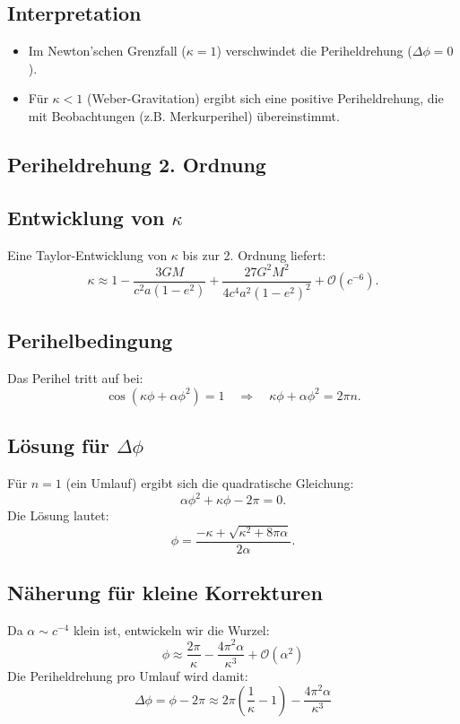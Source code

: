 \subsection*{Interpretation}
\begin{itemize}
\item Im Newton'schen Grenzfall ($\kappa = 1$) verschwindet die Periheldrehung ($\Delta\phi = 0$).
\item Für $\kappa < 1$ (Weber-Gravitation) ergibt sich eine positive Periheldrehung, die mit Beobachtungen (z.B. Merkurperihel) übereinstimmt.
\end{itemize}

\subsection{Periheldrehung 2. Ordnung}
\subsection*{Entwicklung von $\kappa$}
Eine Taylor-Entwicklung von $\kappa$ bis zur 2. Ordnung liefert:
\[
    \kappa \approx 1 - \frac{3GM}{c^2 a(1 - e^2)} + \frac{27G^2 M^2}{4c^4 a^2 (1 - e^2)^2} + \mathcal{O}(c^{-6}).
\]

\subsection*{Perihelbedingung}
Das Perihel tritt auf bei:
\[
    \cos\left(\kappa\phi + \alpha\phi^2\right) = 1 \quad \Rightarrow \quad \kappa\phi + \alpha\phi^2 = 2\pi n.
\]

\subsection*{Lösung für $\Delta\phi$}
Für $n=1$ (ein Umlauf) ergibt sich die quadratische Gleichung:
\[
\alpha\phi^2 + \kappa\phi - 2\pi = 0.
\]
Die Lösung lautet:
\begin{equation}
\phi = \frac{-\kappa + \sqrt{\kappa^2 + 8\pi\alpha}}{2\alpha}.
\end{equation}

\subsection*{Näherung für kleine Korrekturen}
Da $\alpha \sim c^{-4}$ klein ist, entwickeln wir die Wurzel:
\[
    \phi \approx \frac{2\pi}{\kappa} - \frac{4\pi^2\alpha}{\kappa^3} + \mathcal{O}(\alpha^2)
\]
Die Periheldrehung pro Umlauf wird damit:
\begin{equation}
    \boxed
    {
        \Delta\phi = \phi - 2\pi \approx 2\pi\left(\frac{1}{\kappa} - 1\right) - \frac{4\pi^2\alpha}{\kappa^3}
    }
\end{equation}
